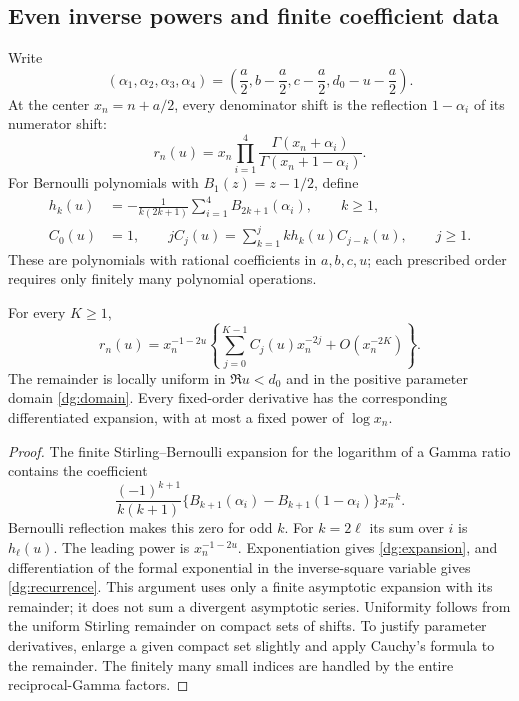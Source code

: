 \subsection{Even inverse powers and finite coefficient data}
Write
\begin{equation}\label{dg:alpha}
 (\alpha_1,\alpha_2,\alpha_3,\alpha_4)
 =\left(\frac a2,b-\frac a2,c-\frac a2,d_0-u-\frac a2\right).
\end{equation}
At the center $x_n=n+a/2$, every denominator shift is the reflection
$1-\alpha_i$ of its numerator shift:
\[
 r_n(u)=x_n\prod_{i=1}^4
       \frac{\Gamma(x_n+\alpha_i)}{\Gamma(x_n+1-\alpha_i)}.
\]
For Bernoulli polynomials with $B_1(z)=z-1/2$, define
\begin{align}
 h_k(u)&=-\frac{1}{k(2k+1)}
                \sum_{i=1}^4B_{2k+1}(\alpha_i),\qquad k\ge1,
                  \label{dg:hk}\\
 C_0(u)&=1,\qquad
 jC_j(u)=\sum_{k=1}^j k h_k(u)C_{j-k}(u),\qquad j\ge1.
                  \label{dg:recurrence}
\end{align}
These are polynomials with rational coefficients in $a,b,c,u$; each
prescribed order requires only finitely many polynomial operations.

\begin{lemma}\label{dg:asymptotic}
For every $K\ge1$,
\begin{equation}\label{dg:expansion}
 r_n(u)=x_n^{-1-2u}
 \left\{\sum_{j=0}^{K-1}C_j(u)x_n^{-2j}+O(x_n^{-2K})\right\}.
\end{equation}
The remainder is locally uniform in $\Re u<d_0$ and in the positive
parameter domain \eqref{dg:domain}. Every fixed-order derivative has
the corresponding differentiated expansion, with at most a fixed
power of $\log x_n$.
\end{lemma}
\begin{proof}
The finite Stirling--Bernoulli expansion for the logarithm of a Gamma
ratio \cite[Section 5.11]{dlmf-gamma} contains the coefficient
\[
 \frac{(-1)^{k+1}}{k(k+1)}
 \{B_{k+1}(\alpha_i)-B_{k+1}(1-\alpha_i)\}x_n^{-k}.
\]
Bernoulli reflection makes this zero for odd $k$. For $k=2\ell$ its
sum over $i$ is $h_\ell(u)$. The leading power is $x_n^{-1-2u}$.
Exponentiation gives \eqref{dg:expansion}, and differentiation of the
formal exponential in the inverse-square variable gives
\eqref{dg:recurrence}. This argument uses only a finite asymptotic
expansion with its remainder; it does not sum a divergent asymptotic
series. Uniformity follows from the uniform Stirling remainder on
compact sets of shifts. To justify parameter derivatives, enlarge a
given compact set slightly and apply Cauchy's formula to the remainder.
The finitely many small indices are handled by the entire
reciprocal-Gamma factors.
\end{proof}

